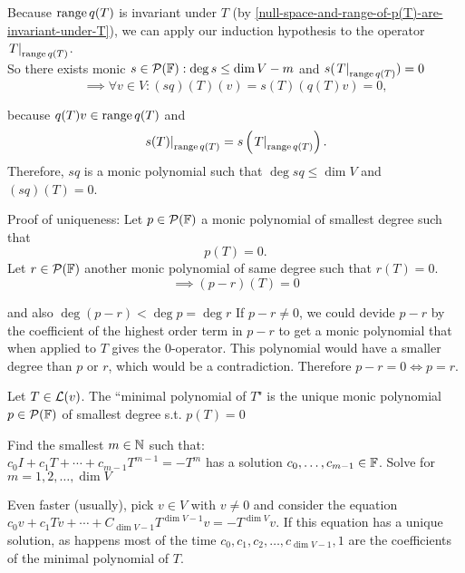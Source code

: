 \begin{prf}
  Because $\operatorname{range} q(T)$ is invariant under $T$ (by \ref{null-space-and-range-of-p(T)-are-invariant-under-T}), we can apply our induction hypothesis to the operator $\left.T\right|_{\operatorname{range} q(T)}$. \\
  So there exists monic $s \in \mathcal{P} (\mathbb{F}): \deg s \leq \dim V - m$ and $s(\left.T\right|_{\operatorname{range} q(T)})=0$ 
  \begin{equation}
    \implies \forall v \in V: (sq)(T)(v) = s(T) (q(T)v) = 0, 
  \end{equation}
  
  because $q(T)v \in \operatorname{range} q(T)$ and \begin{equation}
    \left.s(T)\right|_{\operatorname{range} q(T)}=s\left( \left.T\right|_{\operatorname{range} q(T)} \right ).
  \end{equation}
  Therefore, $sq$ is a monic polynomial such that $\deg sq \leq \dim V$ and $(sq)(T)=0$.

  Proof of uniqueness: Let $p\in \mathcal{P} (\mathbb{F})$ a monic polynomial of smallest degree such that 
  \begin{equation}
    p(T)=0.
  \end{equation} Let $r\in \mathcal{P} ( \mathbb{F})$ another monic polynomial of same degree such that $r(T)=0.$ 
  \begin{equation}
    \implies (p-r) (T) = 0
  \end{equation} 
  
  and also $\deg (p-r) < \deg p = \deg r$ If $p-r \neq 0$, we could devide $p-r$ by the coefficient of the highest order term in $p-r$ to get a monic polynomial that when applied to $T$ gives the $0$-operator. This polynomial would have a smaller degree than $p$ or $r$, which would be a contradiction. Therefore $p-r=0 \iff p = r$.

  
\end{prf}

\setcounter{thm}{23}

\begin{mydef}
  Let $T\in \mathcal{L} (v)$. The ``minimal polynomial of $T$" is the unique monic polynomial $p\in \mathcal{P}(\mathbb{F})$ of smallest degree s.t. $p(T)=0$
\end{mydef}
 Find the smallest $m \in \mathbb{N}$ such that: \\
$c_0I + c_1 T + \cdots + c_{m-1} T^{m-1} = -T^{m}$ has a solution $c_0, \dots, c_{m-1} \in \mathbb{F}$. Solve for $m=1,2,\dots,\dim V$

Even faster (usually), pick $v \in V$ with $v \neq 0$ and consider the equation $c_0v + c_1Tv + \cdots + C_{\dim V-1}T^{\dim V-1}v=-T^{\dim V}v$.
If this equation has a unique solution, as happens most of the time $c_0, c_1, c_2, \dots, c_{\dim V-1}, 1$ are the coefficients of the minimal polynomial of $T$.

